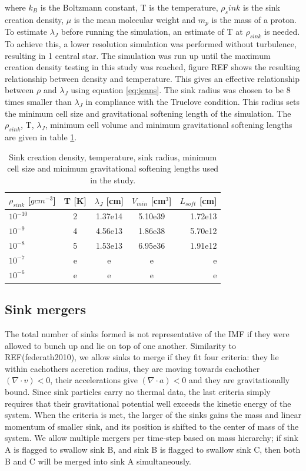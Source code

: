 \documentclass[fleqn,usenatbib]{mnras}
\begin{document}
where $k_B$ is the Boltzmann constant, T is the temperature, $\rho_sink$ is the sink creation density, $\mu$ is the mean molecular weight and $m_p$ is the mass of a proton. To estimate $\lambda_J$ before running the simulation, an estimate of T at $\rho_{sink}$ is needed. To achieve this, a lower resolution simulation was performed without turbulence, resulting in 1 central star. The simulation was run up until the maximum creation density testing in this study was reached, figure REF shows the resulting relationship between density and temperature. This gives an effective relationship between $\rho$ and $\lambda_J$ using equation \ref{eq:jeans}. The sink radius was chosen to be 8 times smaller than $\lambda_J$ in compliance with the Truelove condition. This radius sets the minimum cell size and gravitational softening length of the simulation. The $\rho_{sink}$, T, $\lambda_J$, minimum cell volume and minimum gravitational softening lengths are given in table \ref{table:1}.

\begin{table}
	\centering
	\caption{Sink creation density, temperature, sink radius, minimum cell size and minimum gravitational softening lengths used in the study.}
	\label{table:1}
	\begin{tabular}{lcccr} %
		\hline
		$\rho_{sink}$ [$gcm^{-3}$] & T [K] & $\lambda_J$ [cm] & $V_{min}$ [cm$^{3}$] & $L_{soft}$ [cm]\\
		\hline
		$10^{-10}$ & 2 & 1.37e14 & 5.10e39 & 1.72e13\\
		$10^{-9}$ & 4 & 4.56e13 & 1.86e38 & 5.70e12\\
		$10^{-8}$ & 5 & 1.53e13 & 6.95e36 & 1.91e12\\
		$10^{-7}$ & e & e & e & e\\
		$10^{-6}$ & e & e & e & e\\
		\hline
	\end{tabular}
\end{table}

\subsection{Sink mergers}
The total number of sinks formed is not representative of the IMF if they were allowed to bunch up and lie on top of one another. Similarity to REF(federath2010), we allow sinks to merge if they fit four criteria: they lie within eachothers accretion radius, they are moving towards eachother $(\nabla \cdot v) < 0$, their accelerations give $(\nabla \cdot a) <0$ and they are gravitationally bound. Since sink particles carry no thermal data, the last criteria simply requires that their gravitational potential well exceeds the kinetic energy of the system. When the criteria is met, the larger of the sinks gains the mass and linear momentum of smaller sink, and its position is shifted to the center of mass of the system. We allow multiple mergers per time-step based on mass hierarchy; if sink A is flagged to swallow sink B, and sink B is flagged to swallow sink C, then both B and C will be merged into sink A simultaneously. 
\end{document}
